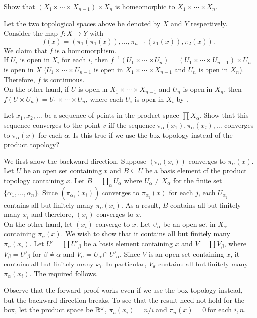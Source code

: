 	\setcounter{exercise}{3}
	\begin{exercise}
		Show that $(X_1\times \cdots\times X_{n-1})\times X_n$ is homeomorphic to $X_1\times\cdots\times X_n$.
	\end{exercise}
	\begin{solution*}
		Let the two topological spaces above be denoted by $X$ and $Y$ respectively. Consider the map $f:X\to Y$ with
		\[ f(x) = (\pi_1(\pi_1(x)), \ldots, \pi_{n-1}(\pi_1(x)), \pi_2(x)). \]
		We claim that $f$ is a homomorphism.\\
		If $U_i$ is open in $X_i$ for each $i$, then $f^{-1}(U_1\times\cdots\times U_n)=(U_1\times\cdots\times U_{n-1})\times U_n$ is open in $X$ ($U_1\times\cdots\times U_{n-1}$ is open in $X_1\times\cdots\times X_{n-1}$ and $U_n$ is open in $X_n$). Therefore, $f$ is continuous.\\
		On the other hand, if $U$ is open in $X_1\times\cdots\times X_{n-1}$ and $U_n$ is open in $X_n$, then $f(U\times U_n) = U_1\times\cdots\times U_n$, where each $U_i$ is open in $X_i$ by .
	\end{solution*}

	\setcounter{exercise}{5}
	\begin{exercise}
		Let $x_1,x_2,\ldots$ be a sequence of points in the product space $\prod X_\alpha$. Show that this sequence converges to the point $x$ iff the sequence $\pi_\alpha(x_1),\pi_\alpha(x_2),\ldots$ converges to $\pi_\alpha(x)$ for each $\alpha$. Is this true if we use the box topology instead of the product topology?
	\end{exercise}
	\begin{solution*}
		We first show the backward direction. Suppose $(\pi_\alpha(x_i))$ converges to $\pi_\alpha(x)$. Let $U$ be an open set containing $x$ and $B\subseteq U$ be a basis element of the product topology containing $x$. Let $B=\prod_\alpha U_\alpha$ where $U_\alpha\neq X_\alpha$ for the finite set $\{\alpha_1,\ldots,\alpha_n\}$. Since $(\pi_{\alpha_j}(x_i))$ converges to $\pi_{\alpha_j}(x)$ for each $j$, each $U_{\alpha_j}$ contains all but finitely many $\pi_\alpha(x_i)$. As a result, $B$ contains all but finitely many $x_i$ and therefore, $(x_i)$ converges to $x$.\\

		On the other hand, let $(x_i)$ converge to $x$. Let $U_\alpha$ be an open set in $X_\alpha$ containing $\pi_\alpha(x)$. We wish to show that it contains all but finitely many $\pi_\alpha(x_i)$. Let $U'=\prod U'_\beta$ be a basis element containing $x$ and $V=\prod V_\beta$, where $V_\beta=U'_\beta$ for $\beta\neq\alpha$ and $V_\alpha=U_\alpha\cap U'_\alpha$. Since $V$ is an open set containing $x$, it contains all but finitely many $x_i$. In particular, $V_\alpha$ contains all but finitely many $\pi_\alpha(x_i)$. The required follows.

		Observe that the forward proof works even if we use the box topology instead, but the backward direction breaks. To see that the result need not hold for the box, let the product space be $\mathbb{R}^\omega$, $\pi_n(x_i)=n/i$ and $\pi_n(x)=0$ for each $i,n$.
	\end{solution*}

